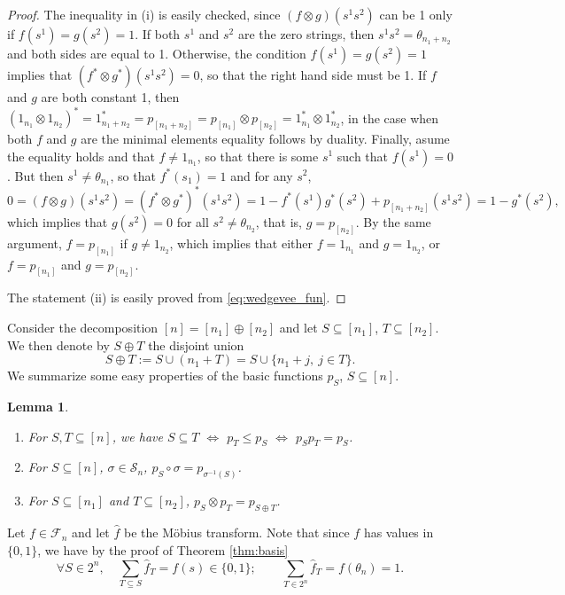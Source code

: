 \documentclass[12pt]{article}
\newtheorem{lemma}{Lemma}
\theoremstyle{definition}
\theoremstyle{remark}
\def\Fe{\mathcal F}
\def\permut{\mathscr{S}}
\begin{document}
\begin{proof} The inequality in (i) is easily  checked, since $(f\otimes g)(s^1s^2)$ can be 1 only if
$f(s^1)=g(s^2)=1$. If both $s^1$ and $s^2$ are the zero strings, then $s^1s^2=\theta_{n_1+n_2}$ and both sides
are equal to 1. Otherwise, the condition $f(s^1)=g(s^2)=1$ implies that $(f^*\otimes
g^*)(s^1s^2)=0$, so that the right hand side must be 1. If $f$ and $g$ are both
constant 1, then $(1_{n_1}\otimes 1_{n_2})^*=1_{n_1+n_2}^*=p_{[n_1+n_2]}=p_{[n_1]}\otimes
p_{[n_2]}=1_{n_1}^*\otimes
1_{n_2}^*$, in the case when both $f$
and $g$ are the minimal elements equality  follows by
duality. Finally, asume the equality holds and that $f\ne 1_{n_1}$, so that there is some $s^1$ such that 
$f(s^1)=0$. But then $s^1\ne \theta_{n_1}$, so that $f^*(s_1)=1$  and for any $s^2$,
\[
0=(f\otimes g)(s^1s^2)=(f^*\otimes
g^*)^*(s^1s^2)=1-f^*(s^1)g^*(s^2)+p_{[n_1+n_2]}(s^1s^2)=1-g^*(s^2),
\]
which implies that $g(s^2)=0$ for all $s^2\ne\theta_{n_2}$, that is, $g=p_{[n_2]}$. By the same argument,
$f=p_{[n_1]}$ if $g\ne 1_{n_2}$, which implies that either $f=1_{n_1}$ and $g=1_{n_2}$, or
$f=p_{[n_1]}$ and $g=p_{[n_2]}$.

The statement (ii) is easily proved from \eqref{eq:wedgevee_fun}.

\end{proof}

Consider the decomposition $[n]=[n_1]\oplus [n_2]$ and let $S\subseteq [n_1]$,
$T\subseteq [n_2]$. We then denote by $S\oplus T$ the disjoint union 
\[
S\oplus T:=S\cup (n_1+T)=S\cup\{n_1+j,\ j\in T\}.
\]
We summarize some easy properties of the basic functions $p_S$, $S\subseteq [n]$.

\begin{lemma}\label{lemma:PSPT}
\begin{enumerate}
\item[(i)] For $S,T\subseteq [n]$, we have $S\subseteq T$ $\iff$ $p_T\le p_S$ $\iff$
$p_Sp_T=p_S$.
\item[(ii)] For $S\subseteq [n]$, $\sigma\in \permut_n$,
$p_S\circ\sigma=p_{\sigma^{-1}(S)}$.
\item[(iii)] For $S\subseteq [n_1]$ and $T\subseteq [n_2]$, $p_S\otimes p_T=p_{S\oplus T}$.

\end{enumerate}
\end{lemma}

Let $f\in \Fe_n$ and let $\hat f$ be the M\"obius transform. Note that since $f$ has
values in $\{0,1\}$, we have by the proof of Theorem \ref{thm:basis}
\[
\forall S\in 2^n, \quad \sum_{T\subseteq S} \hat f_T=f(s)\in \{0,1\}; \qquad \sum_{T\in 2^n} \hat
f_T=f(\theta_n)=1.
\]
\end{document}
